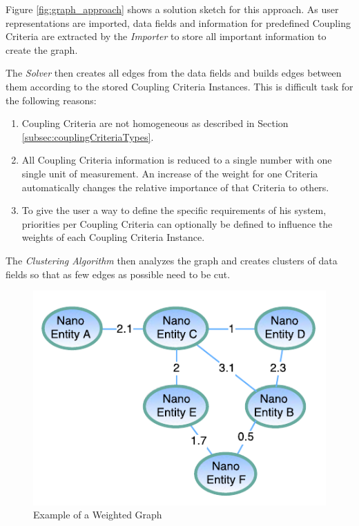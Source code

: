 \begin{minipage}[t]{0.5\textwidth}
	Figure \ref{fig:graph_approach} shows a solution sketch for this approach. As user representations are imported, data fields and  information for predefined Coupling Criteria are extracted by the \textit{Importer} to store all important information to create the graph.
	
	The \textit{Solver} then creates all edges from the data fields and builds edges between them according to the stored Coupling Criteria Instances. This is difficult task for the following reasons:
	
	\begin{enumerate}
		\item Coupling Criteria are not homogeneous as described in Section \ref{subsec:couplingCriteriaTypes}. 
		
		\item All Coupling Criteria information is reduced to a single number with one single unit of measurement. An increase of the weight for one Criteria automatically changes the relative importance of that Criteria to others.
		
		\item To give the user a way to define the specific requirements of his system, priorities per Coupling Criteria can optionally be defined to influence the weights of each Coupling Criteria Instance. 
	\end{enumerate}
	
	The \textit{Clustering Algorithm} then analyzes the graph and creates clusters of data fields so that as few edges as possible need to be cut.
	
	\begin{figure}[H]
		\includegraphics[scale=1.0]{diagrams/weighted_graph.pdf}
		\caption{Example of a Weighted Graph}
		\label{fig:weighted_graph}
	\end{figure}

\end{minipage}
